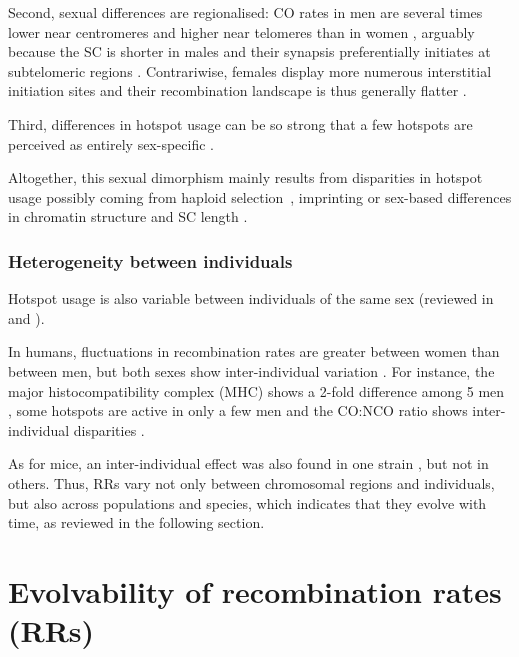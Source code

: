 Second, sexual differences are regionalised: CO rates in men are several times lower near centromeres and higher near telomeres than in women \citep[reviewed in][]{buard2007playing}, arguably because the SC is shorter in males \citep{tease2004intersex} and their synapsis preferentially initiates at subtelomeric regions \citep{brown2005meiotic}.
Contrariwise, females display more numerous interstitial initiation sites and their recombination landscape is thus generally flatter \citep{paigen2008recombinational}.

Third, differences in hotspot usage can be so strong that a few hotspots are perceived as entirely sex-specific \citep{shiroishi1990recombinational,shiroishi1991genetic}.

Altogether, this sexual dimorphism mainly results from disparities in hotspot usage \citep{brick2018extensive} possibly coming from haploid selection \citep{lenormand2005recombination}, imprinting \citep{lercher2003imprinted} or sex-based differences in chromatin structure \citep{gerton2005homologous} and SC length \citep{petkov2007crossover}.


\subsubsection{Heterogeneity between individuals}

Hotspot usage is also variable between individuals of the same sex (reviewed in \citealp{popa2011evolution} and \citealp{capilla2016mammalian}).

In humans, fluctuations in recombination rates are greater between women than between men, but both sexes show inter-individual variation \citep{cheung2007polymorphic}.
For instance, the major histocompatibility complex (MHC) shows a 2-fold difference among 5 men \citep{yu1996individual}, some hotspots are active in only a few men \citep{neumann2006polymorphism} and the CO:NCO ratio shows inter-individual disparities \citep{jeffreys2005factors,sarbajna2012major}.

As for mice, an inter-individual effect was also found in one strain \citep{koehler2002genetic}, but not in others.
Thus, RRs vary not only between chromosomal regions and individuals, but also across populations and species, which indicates that they evolve with time, as reviewed in the following section.





\section{Evolvability of recombination rates (RRs)}

